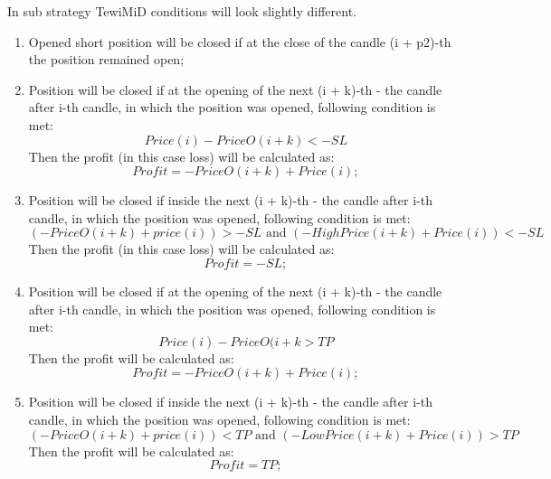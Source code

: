\documentclass{tewiart}
\begin{document}
\noindent In sub strategy TewiMiD conditions will look slightly different.
\begin{enumerate}
\item Opened short position will be closed if at the close of the candle (i + p2)-th the position remained open;\\


\item Position will be closed if at the opening of the next (i + k)-th - the candle after i-th candle, in which the position was opened, following condition is met:
\begin{equation}
Price(i)-PriceO(i+k)<-SL
\end{equation}                                      
Then the profit (in this case loss) will be calculated as:
\begin{equation}
Profit =-PriceO (i+k) +  Price(i) ;
\end{equation}

\item Position will be closed if inside the next (i + k)-th - the candle after i-th candle, in which the position was opened, following condition is met:
\begin{equation}
(-PriceO (i+k)+price(i) )>-SL \text{ and } (-HighPrice(i+k)+Price(i))<-SL
\end{equation}                          
Then the profit (in this case loss) will be calculated as:
\begin{equation}
Profit =-SL; 
\end{equation}

\item Position will be closed if at the opening of the next (i + k)-th - the candle after i-th candle, in which the position was opened, following condition is met:
\begin{equation}
Price(i)-PriceO(i+k>TP
\end{equation}                                           
Then the profit will be calculated as:
\begin{equation}
Profit =-PriceO (i+k)  + Price(i) ;
\end{equation} 


\item Position will be closed if inside the next (i + k)-th - the candle after i-th candle, in which the position was opened, following condition is met: 
\begin{equation}
(-PriceO(i+k)+price(i) )<TP \text{ and } (-LowPrice(i+k)+Price(i))>TP
\end{equation}
Then the profit will be calculated as:
\begin{equation}
Profit =TP; 
\end{equation}


\end{enumerate}
\end{document}
